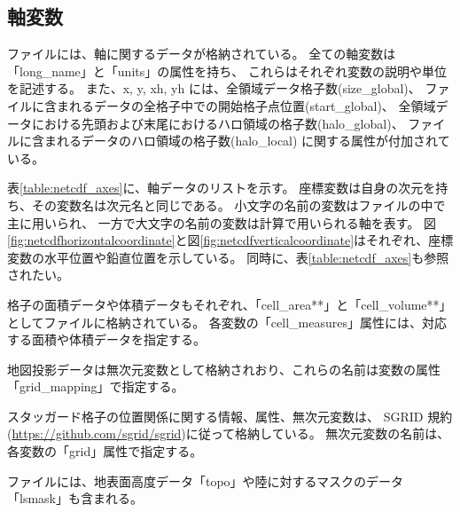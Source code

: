 \subsection{軸変数}
\scalenetcdf ファイルには、軸に関するデータが格納されている。
全ての軸変数は「long\_name」と「units」の属性を持ち、
これらはそれぞれ変数の説明や単位を記述する。
また、x, y, xh, yh には、全領域データ格子数(size\_global)、
ファイルに含まれるデータの全格子中での開始格子点位置(start\_global)、
全領域データにおける先頭および末尾におけるハロ領域の格子数(halo\_global)、
ファイルに含まれるデータのハロ領域の格子数(halo\_local) に関する属性が付加されている。

表\ref{table:netcdf_axes}に、軸データのリストを示す。
座標変数は自身の次元を持ち、その変数名は次元名と同じである。
小文字の名前の変数はファイルの中で主に用いられ、
一方で大文字の名前の変数は計算で用いられる軸を表す。
図\ref{fig:netcdfhorizontalcoordinate}と図\ref{fig:netcdfverticalcoordinate}はそれぞれ、座標変数の水平位置や鉛直位置を示している。
同時に、表\ref{table:netcdf_axes}も参照されたい。

格子の面積データや体積データもそれぞれ、「cell\_area**」と「cell\_volume**」としてファイルに格納されている。
各変数の「cell\_measures」属性には、対応する面積や体積データを指定する。

地図投影データは無次元変数として格納されおり、これらの名前は変数の属性「grid\_mapping」で指定する。

スタッガード格子の位置関係に関する情報、属性、無次元変数は、
SGRID 規約(\url{https://github.com/sgrid/sgrid})に従って格納している。
無次元変数の名前は、各変数の「grid」属性で指定する。

ファイルには、地表面高度データ「topo」や陸に対するマスクのデータ「lsmask」も含まれる。


